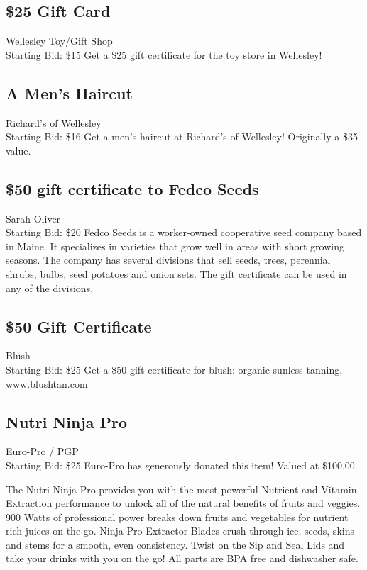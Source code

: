\documentclass[11pt]{article}
\begin{document}
\subsection{\$25 Gift Card}
Wellesley Toy/Gift Shop
\\
Starting Bid: \$15
\newline
Get a \$25 gift certificate for the toy store in Wellesley!
\subsection{A Men's Haircut}
Richard's of Wellesley
\\
Starting Bid: \$16
\newline
Get a men's haircut at Richard's of Wellesley! Originally a \$35 value.
\subsection{\$50 gift certificate to Fedco Seeds}
Sarah Oliver
\\
Starting Bid: \$20
\newline
Fedco Seeds is a worker-owned cooperative seed company based in Maine. It specializes in varieties that grow well in areas with short growing seasons. The company has several divisions that sell seeds, trees, perennial shrubs, bulbs, seed potatoes and onion sets. The gift certificate can be used in any of the divisions.
\subsection{\$50 Gift Certificate}
Blush
\\
Starting Bid: \$25
\newline
Get a \$50 gift certificate for blush: organic sunless tanning.
www.blushtan.com
\subsection{Nutri Ninja Pro}
Euro-Pro / PGP
\\
Starting Bid: \$25
\newline
Euro-Pro has generously donated this item! Valued at \$100.00

The Nutri Ninja Pro provides you with the most powerful Nutrient and Vitamin Extraction performance to unlock all of the natural benefits of fruits and veggies. 900 Watts of professional power breaks down fruits and vegetables for nutrient rich juices on the go. Ninja Pro Extractor Blades crush through ice, seeds, skins and stems for a smooth, even consistency. Twist on the Sip and Seal Lids and take your drinks with you on the go! All parts are BPA free and dishwasher safe.
\end{document}
